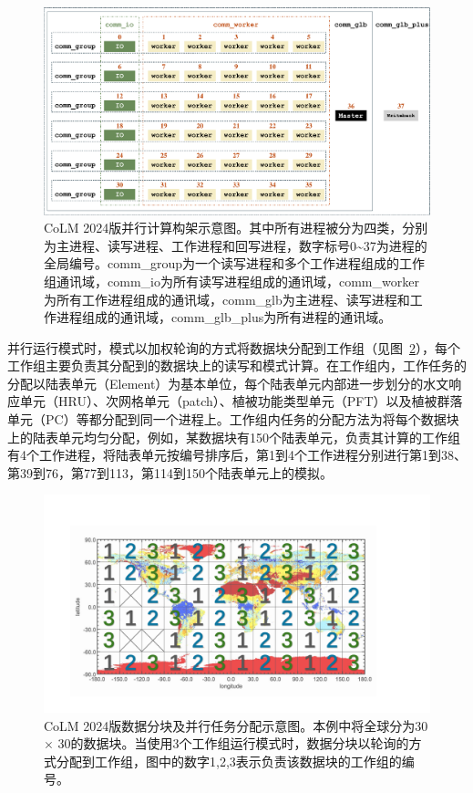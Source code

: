 \documentclass[a4paper,12pt,twoside]{article}
\begin{document}
\begin{figure}[htpb]
    \centering
    \includegraphics[width=\textwidth]{figures/并行计算图.pdf}
    \caption{CoLM 2024版并行计算构架示意图。其中所有进程被分为四类，分别为主进程、读写进程、工作进程和回写进程，数字标号0\textasciitilde 37为进程的全局编号。comm\_group为一个读写进程和多个工作进程组成的工作组通讯域，comm\_io为所有读写进程组成的通讯域，comm\_worker为所有工作进程组成的通讯域，comm\_glb为主进程、读写进程和工作进程组成的通讯域，comm\_glb\_plus为所有进程的通讯域。}
    \label{fig:fig_parallelization}
\end{figure}

并行运行模式时，模式以加权轮询的方式将数据块分配到工作组（见图~\ref{fig:fig_block}），每个工作组主要负责其分配到的数据块上的读写和模式计算。在工作组内，工作任务的分配以陆表单元（Element）为基本单位，每个陆表单元内部进一步划分的水文响应单元（HRU）、次网格单元（patch）、植被功能类型单元（PFT）以及植被群落单元（PC）等都分配到同一个进程上。工作组内任务的分配方法为将每个数据块上的陆表单元均匀分配，例如，某数据块有150个陆表单元，负责其计算的工作组有4个工作进程，将陆表单元按编号排序后，第1到4个工作进程分别进行第1到38、第39到76，第77到113，第114到150个陆表单元上的模拟。

\begin{figure}[htpb]
    \centering
    \includegraphics[width=\textwidth]{figures/数据分块示意图.pdf}
    \caption{CoLM 2024版数据分块及并行任务分配示意图。本例中将全球分为30\textdegree$\times$ 30\textdegree 的数据块。当使用3个工作组运行模式时，数据分块以轮询的方式分配到工作组，图中的数字1,2,3表示负责该数据块的工作组的编号。}
    \label{fig:fig_block}
\end{figure}
\end{document}
